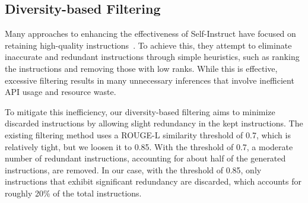 \begin{comment}
We adopt a strategy that enhances the diversity of batches
by implementing loose ROUGE-L similarity-based filtering. This approach is
designed to improve filtering efficiency without compromising model
performance, achieving low cost.
Our methodology is inspired by research findings
suggesting that increasing the diversity of each batch (local diversity) is
beneficial, especially when the data distribution is skewed, meaning low global
diversity.~\cite{todo, todo}

Simultaneously, to enhance the quality of data generation, we integrate the data
generation and training procedures in a pipeline manner. This integration allows
us to leverage insights gained during the training process to improve the
quality of the generated data. Through this approach, we aim to reduce the
number of API calls required for data generation or human effort for post-validation,
thereby achieving a cost-efficient method while also enhancing the quality of
the data by feedback-based data generation.
\end{comment}



\subsection{Diversity-based Filtering}

Many approaches to enhancing the effectiveness of Self-Instruct have focused on
retaining high-quality instructions~\cite{alpagasus, modelcollapse1}. 
To achieve this, they attempt to eliminate inaccurate and 
redundant instructions through simple heuristics, 
such as ranking the instructions and removing those with low ranks. 
While this is effective, excessive filtering results in many
unnecessary inferences that involve inefficient API usage and resource waste. 


To mitigate this inefficiency, our diversity-based filtering aims to minimize
discarded instructions by allowing slight redundancy in the kept instructions.
The existing filtering method uses a ROUGE-L similarity threshold of 0.7, 
which is relatively tight,
but we loosen it %
to 0.85. With the threshold of 0.7, 
a moderate number of redundant instructions, 
accounting for about half of the generated instructions, are removed.
In our case, with the threshold of 0.85, 
only instructions that exhibit significant redundancy are discarded, 
which accounts for roughly 20\% of the total instructions.


